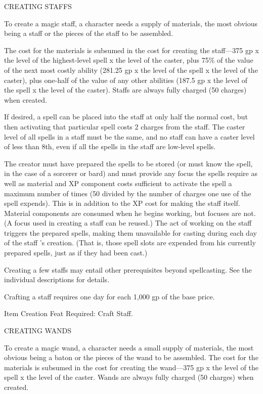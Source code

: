 \documentclass{article}
\begin{document}
\vspace{12pt}
{\large{}CREATING STAFFS}

To create a magic staff, a character needs a supply of materials, the most obvious 
being a staff or the pieces of the staff to be assembled.

The cost for the materials is subsumed in the cost for creating the staff---375 
gp x the level of the highest-level spell x the level of the caster, plus 75\% 
of the value of the next most costly ability (281.25 gp x the level of the spell 
x the level of the caster), plus one-half of the value of any other abilities (187.5 
gp x the level of the spell x the level of the caster). Staffs are always fully 
charged (50 charges) when created.

If desired, a spell can be placed into the staff at only half the normal cost, 
but then activating that particular spell costs 2 charges from the staff. The caster 
level of all spells in a staff must be the same, and no staff can have a caster 
level of less than 8th, even if all the spells in the staff are low-level spells.

The creator must have prepared the spells to be stored (or must know the spell, 
in the case of a sorcerer or bard) and must provide any focus the spells require 
as well as material and XP component costs sufficient to activate the spell a maximum 
number of times (50 divided by the number of charges one use of the spell expends). 
This is in addition to the XP cost for making the staff itself. Material components 
are consumed when he begins working, but focuses are not. (A focus used in creating 
a staff can be reused.) The act of working on the staff triggers the prepared spells, 
making them unavailable for casting during each day of the staff 's creation. (That 
is, those spell slots are expended from his currently prepared spells, just as 
if they had been cast.)

Creating a few staffs may entail other prerequisites beyond spellcasting. See the 
individual descriptions for details.

Crafting a staff requires one day for each 1,000 gp of the base price.

Item Creation Feat Required: Craft Staff.

\vspace{12pt}
{\large{}CREATING WANDS}

To create a magic wand, a character needs a small supply of materials, the most 
obvious being a baton or the pieces of the wand to be assembled. The cost for the 
materials is subsumed in the cost for creating the wand---375 gp x the level of 
the spell x the level of the caster. Wands are always fully charged (50 charges) 
when created.
\end{document}
